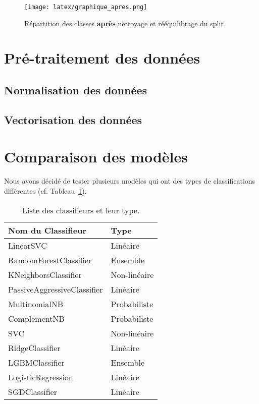 \documentclass[11pt]{article}
\begin{document}
\begin{figure}[h]
  \texttt{[image: latex/graphique\_apres.png]}
  \caption{Répartition des classes \textbf{après} nettoyage et rééquilibrage du split}
  \label{fig:graph_apres} %
\end{figure}


\section{Pré-traitement des données}

\subsection{Normalisation des données}

\subsection{Vectorisation des données}

\section{Comparaison des modèles}
Nous avons décidé de tester plusieurs modèles qui ont des types de classifications différentes (cf. Tableau~\ref{tab:classifieurs_types}).

\begin{table}[h]
    \centering
    \begin{tabular}{|l|l|}
        \hline
        \textbf{Nom du Classifieur}        & \textbf{Type} \\ \hline
        LinearSVC                         & Linéaire      \\ \hline
        RandomForestClassifier            & Ensemble      \\ \hline
        KNeighborsClassifier              & Non-linéaire  \\ \hline
        PassiveAggressiveClassifier       & Linéaire      \\ \hline
        MultinomialNB                     & Probabiliste  \\ \hline
        ComplementNB                      & Probabiliste  \\ \hline
        SVC                               & Non-linéaire  \\ \hline
        RidgeClassifier                   & Linéaire      \\ \hline
        LGBMClassifier                    & Ensemble      \\ \hline
        LogisticRegression                & Linéaire      \\ \hline
        SGDClassifier                     & Linéaire      \\ \hline
    \end{tabular}
    \caption{Liste des classifieurs et leur type.}
    \label{tab:classifieurs_types} %
\end{table}
\end{document}
